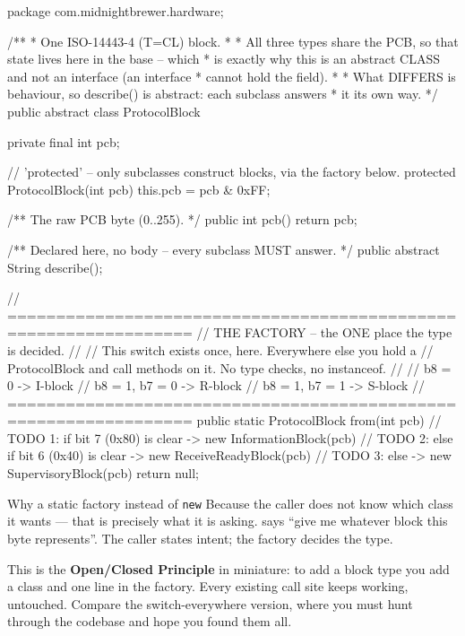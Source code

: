 \begin{jcode}
package com.midnightbrewer.hardware;

/**
 * One ISO-14443-4 (T=CL) block.
 *
 * All three types share the PCB, so that state lives here in the base -- which
 * is exactly why this is an abstract CLASS and not an interface (an interface
 * cannot hold the field).
 *
 * What DIFFERS is behaviour, so describe() is abstract: each subclass answers
 * it its own way.
 */
public abstract class ProtocolBlock {

    private final int pcb;

    // 'protected' -- only subclasses construct blocks, via the factory below.
    protected ProtocolBlock(int pcb) {
        this.pcb = pcb & 0xFF;
    }

    /** The raw PCB byte (0..255). */
    public int pcb() {
        return pcb;
    }

    /** Declared here, no body -- every subclass MUST answer. */
    public abstract String describe();

    // =================================================================
    // THE FACTORY -- the ONE place the type is decided.
    //
    // This switch exists once, here. Everywhere else you hold a
    // ProtocolBlock and call methods on it. No type checks, no instanceof.
    //
    //   b8 = 0         -> I-block
    //   b8 = 1, b7 = 0 -> R-block
    //   b8 = 1, b7 = 1 -> S-block
    // =================================================================
    public static ProtocolBlock from(int pcb) {
        // TODO 1: if bit 7 (0x80) is clear      -> new InformationBlock(pcb)
        // TODO 2: else if bit 6 (0x40) is clear -> new ReceiveReadyBlock(pcb)
        // TODO 3: else                          -> new SupervisoryBlock(pcb)
        return null;
    }
}
\end{jcode}

\begin{concept}{Why a static factory instead of \texttt{new}}
Because the caller does not know which class it wants --- that is precisely what
it is asking.  says ``give me whatever block this
byte represents''. The caller states intent; the factory decides the type.

This is the \textbf{Open/Closed Principle} in miniature: to add a block type you
add a class and one line in the factory. Every existing call site keeps working,
untouched. Compare the switch-everywhere version, where you must hunt through the
codebase and hope you found them all.
\end{concept}

